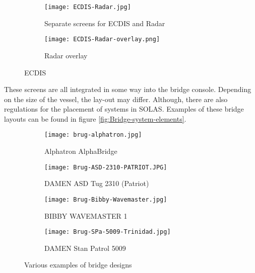 \begin{figure}[p]
	\centering
	
	\begin{subfigure}[b]{0.6\textwidth}
		\texttt{[image: ECDIS-Radar.jpg]}
		\caption{Separate screens for ECDIS and Radar}
	\end{subfigure}
	\hfill
	\begin{subfigure}[b]{0.37\textwidth}
		\texttt{[image: ECDIS-Radar-overlay.png]}
		\caption{Radar overlay}
	\end{subfigure}
	
	\caption{\acf{ECDIS}}
	\label{fig:ECDIS-example}
	
\end{figure}

These screens are all integrated in some way into the bridge console. Depending on the size of the vessel, the lay-out may differ. Although, there are also regulations for the placement of systems in \ac{SOLAS}. Examples of these bridge layouts can be found in figure \ref{fig:Bridge-system-elements}.

\begin{figure}[p]
	\centering
	
	\begin{subfigure}[b]{0.45\textwidth}
		\texttt{[image: brug-alphatron.jpg]}
		\caption{Alphatron AlphaBridge}
	\end{subfigure}
	\hfill
	\begin{subfigure}[b]{0.45\textwidth}
		\texttt{[image: Brug-ASD-2310-PATRIOT.JPG]}
		\caption{DAMEN ASD Tug 2310 (Patriot)}
	\end{subfigure}
	\hfill
	\begin{subfigure}[b]{0.45\textwidth}
		\texttt{[image: Brug-Bibby-Wavemaster.jpg]}
		\caption{BIBBY WAVEMASTER 1}
	\end{subfigure}
	\hfill
	\begin{subfigure}[b]{0.45\textwidth}
		\texttt{[image: Brug-SPa-5009-Trinidad.jpg]}
		\caption{DAMEN Stan Patrol 5009}
	\end{subfigure}	
	
	\caption{Various examples of bridge designs}
	\label{fig:bridge-example}
	
\end{figure}


